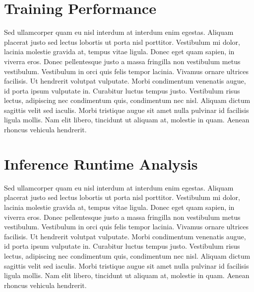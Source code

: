 

\section{Training Performance}

Sed ullamcorper quam eu nisl interdum at interdum enim egestas. Aliquam placerat justo sed lectus lobortis ut porta
nisl porttitor. Vestibulum mi dolor, lacinia molestie gravida at, tempus vitae ligula. Donec eget quam sapien, in
viverra eros. Donec pellentesque justo a massa fringilla non vestibulum metus vestibulum. Vestibulum in orci quis
felis tempor lacinia. Vivamus ornare ultrices facilisis. Ut hendrerit volutpat vulputate. Morbi condimentum venenatis
augue, id porta ipsum vulputate in. Curabitur luctus tempus justo. Vestibulum risus lectus, adipiscing nec
condimentum quis, condimentum nec nisl. Aliquam dictum sagittis velit sed iaculis. Morbi tristique augue sit amet
nulla pulvinar id facilisis ligula mollis. Nam elit libero, tincidunt ut aliquam at, molestie in quam. Aenean rhoncus
vehicula hendrerit.

\section{Inference Runtime Analysis}

Sed ullamcorper quam eu nisl interdum at interdum enim egestas. Aliquam placerat justo sed lectus lobortis ut porta
nisl porttitor. Vestibulum mi dolor, lacinia molestie gravida at, tempus vitae ligula. Donec eget quam sapien, in
viverra eros. Donec pellentesque justo a massa fringilla non vestibulum metus vestibulum. Vestibulum in orci quis
felis tempor lacinia. Vivamus ornare ultrices facilisis. Ut hendrerit volutpat vulputate. Morbi condimentum venenatis
augue, id porta ipsum vulputate in. Curabitur luctus tempus justo. Vestibulum risus lectus, adipiscing nec
condimentum quis, condimentum nec nisl. Aliquam dictum sagittis velit sed iaculis. Morbi tristique augue sit amet
nulla pulvinar id facilisis ligula mollis. Nam elit libero, tincidunt ut aliquam at, molestie in quam. Aenean rhoncus
vehicula hendrerit.

